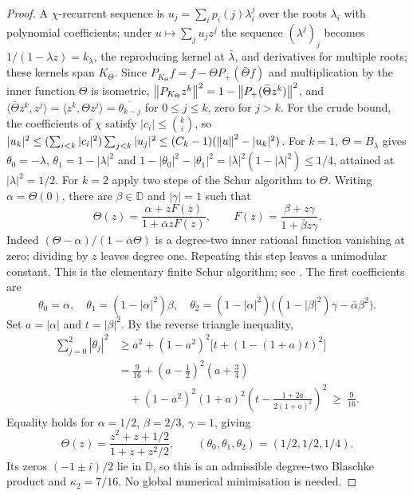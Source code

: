 \begin{proof}
A $\chi$-recurrent sequence is $u_j=\sum_i p_i(j)\lambda_i^j$ over the roots $\lambda_i$
with polynomial coefficients; under $u\mapsto\sum_ju_jz^j$ the sequence $(\lambda^j)_j$
becomes $1/(1-\lambda z)=k_{\bar\lambda}$, the reproducing kernel at $\bar\lambda$, and
derivatives for multiple roots; these kernels span $K_\Theta$. Since
$P_{K_\Theta}f=f-\Theta P_+(\bar\Theta f)$ and multiplication by the inner function $\Theta$
is isometric, $\left\lVert P_{K_\Theta}z^k\right\rVert^2=1-\left\lVert P_+(\bar\Theta z^k)\right\rVert^2$, and
$\langle\bar\Theta z^k,z^j\rangle=\langle z^k,\Theta z^j\rangle=\overline{\theta_{k-j}}$
for $0\le j\le k$, zero for $j>k$. For the crude bound, the coefficients of $\chi$ satisfy
$|c_i|\le\binom ki$, so $|u_k|^2\le(\sum_{i<k}|c_i|^2)\sum_{j<k}|u_j|^2\le(C_k-1)
(\left\lVert u\right\rVert^2-|u_k|^2)$. For $k=1$, $\Theta=B_\lambda$ gives $\theta_0=-\lambda$,
$\theta_1=1-|\lambda|^2$ and $1-|\theta_0|^2-|\theta_1|^2=|\lambda|^2(1-|\lambda|^2)\le1/4$,
attained at $|\lambda|^2=1/2$. For $k=2$ apply two steps of the Schur algorithm to $\Theta$.
Writing $\alpha=\Theta(0)$, there are $\beta\in\mathbb D$ and $|\gamma|=1$
such that
\[
 \Theta(z)=\frac{\alpha+zF(z)}{1+\bar\alpha zF(z)},\qquad
 F(z)=\frac{\beta+z\gamma}{1+\bar\beta z\gamma}.
\]
Indeed $(\Theta-\alpha)/(1-\bar\alpha\Theta)$ is a degree-two inner
rational function vanishing at zero; dividing by $z$ leaves degree one.
Repeating this step leaves a unimodular constant. This is the elementary
finite Schur algorithm; see \citet{schur_nevanlinna}.
The first coefficients are
\[
 \theta_0=\alpha,\quad \theta_1=(1-|\alpha|^2)\beta,\quad
 \theta_2=(1-|\alpha|^2)\bigl((1-|\beta|^2)\gamma-\bar\alpha\beta^2\bigr).
\]
Set $a=|\alpha|$ and $t=|\beta|^2$. By the reverse triangle inequality,
\begin{align*}
 \sum_{j=0}^2|\theta_j|^2
 &\ge a^2+(1-a^2)^2\bigl[t+(1-(1+a)t)^2\bigr]\\
 &=\frac9{16}+(a-\tfrac12)^2(a+\tfrac34)\\
 &\quad +(1-a^2)^2(1+a)^2
 \left(t-\frac{1+2a}{2(1+a)^2}\right)^2
 \ \ge\ \frac9{16}.
\end{align*}
Equality holds for $\alpha=1/2$, $\beta=2/3$, $\gamma=1$, giving
\[
 \Theta(z)=\frac{z^2+z+1/2}{1+z+z^2/2},\qquad
 (\theta_0,\theta_1,\theta_2)=(1/2,1/2,1/4).
\]
Its zeros $(-1\pm i)/2$ lie in $\mathbb D$, so this is an admissible
degree-two Blaschke product and $\kappa_2=7/16$. No global numerical
minimisation is needed.
\end{proof}
